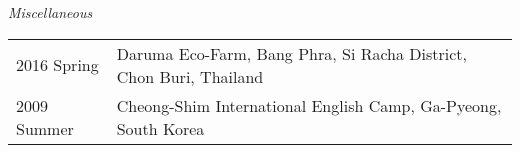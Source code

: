 \documentclass[11pt]{article}
\begin{document}
\textit{Miscellaneous}\\
\begin{longtable}{p{}  p{}}
2016 Spring & Daruma Eco-Farm, Bang Phra, Si Racha District, Chon Buri, Thailand\\
2009 Summer & Cheong-Shim International English Camp, Ga-Pyeong, South Korea\\
\end{longtable}

\hspace{0pt}












\end{document}
